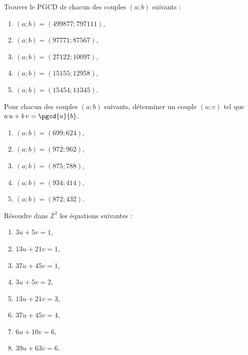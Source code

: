 \begin{exo}\label{exo:arith-16}
      Trouver le PGCD de chacun des couples $(a;b)$ suivants :
      \begin{enumerate}
            \item $(a;b) = (499877;797111)$,
            \item $(a;b) = (97771;87567)$,
            \item $(a;b) = (27122;10097)$,
            \item $(a;b) = (15155;12958) $,
            \item $(a;b) = (15454;11345) $.
      \end{enumerate}
\end{exo}
%
\begin{exo}\label{exo:arith-17}
      Pour chacun des couples $(a;b)$ suivants, d\'eterminer un couple $(u;v)$ tel que
      $a\,u + b\,v = \pgcd{a}{b}$.
      \begin{enumerate}
            \item $(a;b) = (699 ; 624)$,
            \item $(a;b) = (972 ; 962)$,
            \item $(a;b) = (875 ; 788)$,
            \item $(a;b) = (934 ; 414)$,
            \item $(a;b) = (872 ; 432)$.
      \end{enumerate}
\end{exo}
%
\begin{exo}\label{exo:arith-18}
      R\'esoudre dans $\mathbb{Z}^2$ les \'equations suivantes : 
      \begin{enumerate}
            \item $3 u + 5 v = 1$,
            \item $13 u + 21 v = 1$,
            \item $37 u + 45 v = 1$,
            \item $3 u + 5 v = 2$,
            \item $13 u + 21 v = 3$,
            \item $37 u + 45 v = 4$,
            \item $6 u + 10 v = 6$,
            \item $39 u + 63 v = 6$.
      \end{enumerate}
\end{exo}
%
